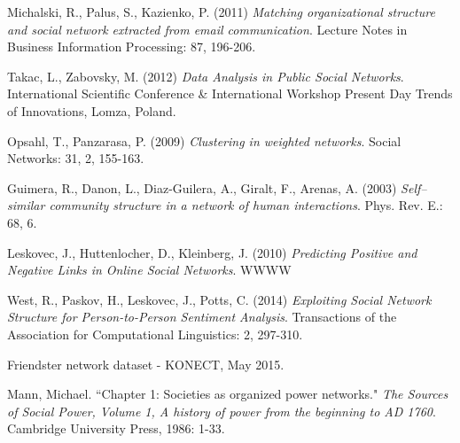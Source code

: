 \documentclass[3p,times]{elsarticle}
\begin{document}
\begin{enumerate}
\begin{thebibliography}{9}
	Michalski, R., Palus, S., Kazienko, P. (2011)
	\textit{Matching organizational structure and social network extracted from email communication}.
	Lecture Notes in Business Information Processing: 87, 196-206.
	
	Takac, L., Zabovsky, M. (2012)
	\textit{Data Analysis in Public Social Networks}.
	International Scientific Conference \& International Workshop Present Day Trends of Innovations, Lomza, Poland.
	
	Opsahl, T., Panzarasa, P. (2009)
	\textit{Clustering in weighted networks}.
	Social Networks: 31, 2, 155-163.
	
	Guimera, R., Danon, L., Diaz-Guilera, A., Giralt, F., Arenas, A. (2003)
	\textit{Self--similar community structure in a network of human interactions}.
	Phys. Rev. E.: 68, 6.
	
	Leskovec, J., Huttenlocher, D., Kleinberg, J. (2010)
	\textit{Predicting Positive and Negative Links in Online Social Networks}.
	WWWW
	
	West, R., Paskov, H., Leskovec, J., Potts, C. (2014)
	\textit{Exploiting Social Network Structure for Person-to-Person Sentiment Analysis}.
	Transactions of the Association for Computational Linguistics: 2, 297-310.

    Friendster network dataset - KONECT, May 2015.
    
    Mann, Michael. ``Chapter 1: Societies as organized power networks."
    \textit{The Sources of Social Power, Volume 1, A history of power from the beginning to AD 1760}. Cambridge University Press, 1986: 1-33.
    
\end{thebibliography}


\end{enumerate}
\end{document}
